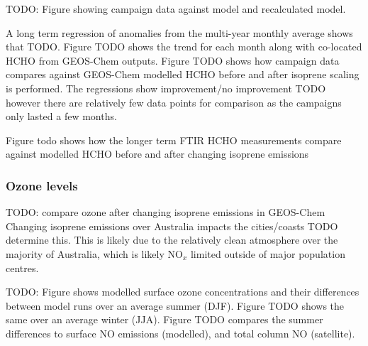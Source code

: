       TODO: Figure showing campaign data against model and recalculated model.
              
      A long term regression of anomalies from the multi-year monthly average shows that TODO.
      Figure TODO shows the trend for each month along with co-located HCHO from GEOS-Chem outputs.
      Figure TODO shows how campaign data compares against GEOS-Chem modelled HCHO before and after isoprene scaling is performed. 
      The regressions show improvement/no improvement TODO however there are relatively few data points for comparison as the campaigns only lasted a few months.
      

      Figure todo shows how the longer term FTIR HCHO measurements compare against modelled HCHO before and after changing isoprene emissions
    
    \subsubsection{Ozone levels}
    
      TODO: compare ozone after changing isoprene emissions in GEOS-Chem
      Changing isoprene emissions over Australia impacts the cities/coasts TODO determine this.
      This is likely due to the relatively clean atmosphere over the majority of Australia, which is likely NO$_x$ limited outside of major population centres.
      
      TODO: Figure shows modelled surface ozone concentrations and their differences between model runs over an average summer (DJF). 
      Figure TODO shows the same over an average winter (JJA).
      Figure TODO compares the summer differences to surface NO emissions (modelled), and total column NO (satellite).

%  
  